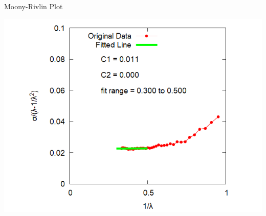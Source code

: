 \documentclass[12pt, dvipdfmx]{beamer}
\begin{document}
\begin{frame}
\begin{columns}[T, onlytextwidth]
\begin{block}{Moony-Rivlin Plot}
\begin{itemize}
						\includegraphics[width= .6\textwidth]{MR_rate_5e-05.png}
					\end{itemize}
					
				\end{block}
		\end{columns}
\end{frame}
\end{document}

